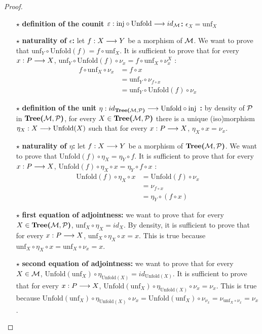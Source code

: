 \begin{proof}~
\begin{itemize}
	\item[$\star$] \textbf{definition of the counit $\varepsilon : \text{inj}\circ \text{Unfold} \longrightarrow id_{\mathcal{M}}$:} $\epsilon_X = \text{unf}_X$
	\item[$\star$] \textbf{naturality of $\epsilon$:} let $f : X \longrightarrow Y$ be a morphism of $\mathcal{M}$. We want to prove that $\text{unf}_Y\circ \text{Unfold}(f) = f \circ \text{unf}_X$. It is sufficient to prove that for every $x : P \longrightarrow X$, $\text{unf}_Y\circ \text{Unfold}(f)\circ\nu_x = f \circ \text{unf}_X\circ \nu_x^X$ :
	\begin{align*}
			f\circ \text{unf}_X \circ \nu_x 	&	=  f \circ x \\
      				 					&	=  \text{unf}_Y\circ \nu_{f\circ x}\\
									&	= \text{unf}_Y\circ \text{Unfold}(f) \circ \nu_x
		\end{align*}
	\item[$\star$] \textbf{definition of the unit $\eta : id_{\textbf{Tree(}\mathcal{M},\mathcal{P}\textbf{)}} \longrightarrow \text{Unfold}\circ \text{inj}$ :} by density of $\mathcal{P}$ in $\textbf{Tree(}\mathcal{M},\mathcal{P}\textbf{)}$, for every $X \in \textbf{Tree(}\mathcal{M},\mathcal{P}\textbf{)}$ there is a unique (iso)morphism $\eta_X : X \longrightarrow \text{Unfold}(X)$ such that for every $x : P \longrightarrow X$, $\eta_X\circ x = \nu_x$.
	\item[$\star$] \textbf{naturality of $\eta$:} let $f : X \longrightarrow Y$ be a morphism of $\textbf{Tree(}\mathcal{M},\mathcal{P}\textbf{)}$. We want to prove that $\text{Unfold}(f)\circ\eta_X = \eta_Y\circ f$. It is sufficient to prove that for every $x : P \longrightarrow X$, $\text{Unfold}(f)\circ\eta_X\circ x = \eta_Y\circ f \circ x$ :
	\begin{align*}
			\text{Unfold}(f)\circ\eta_X\circ x 	&	=  \text{Unfold}(f)\circ \nu_x \\
      				 					&	=  \nu_{f\circ x}\\
									&	= \eta_Y\circ(f\circ x)
	\end{align*}
	\item[$\star$] \textbf{first equation of adjointness:} we want to prove that for every $X \in \textbf{Tree(}\mathcal{M},\mathcal{P}\textbf{)}$, $\text{unf}_X\circ \eta_X = id_X$. By density, it is sufficient to prove that for every $x : P \longrightarrow X$, $\text{unf}_X\circ\eta_X \circ x = x$. This is true because $\text{unf}_X\circ \eta_X\circ x = \text{unf}_X \circ \nu_x = x$.
	\item[$\star$] \textbf{second equation of adjointness:} we want to prove that for every $X\in \mathcal{M}$, $\text{Unfold}(\text{unf}_X)\circ\eta_{\text{Unfold}(X)} = id_{\text{Unfold}(X)}$. It is sufficient to prove that for every $x : P \longrightarrow X$, $\text{Unfold}(\text{unf}_X)\circ \eta_{\text{Unfold}(X)}\circ \nu_x = \nu_x$. This is true because $\text{Unfold}(\text{unf}_X)\circ \eta_{\text{Unfold}(X)}\circ \nu_x = \text{Unfold}(\text{unf}_X) \circ \nu_{\nu_x} = \nu_{\text{unf}_X\circ \nu_x} = \nu_x$.
\end{itemize}
\end{proof}





